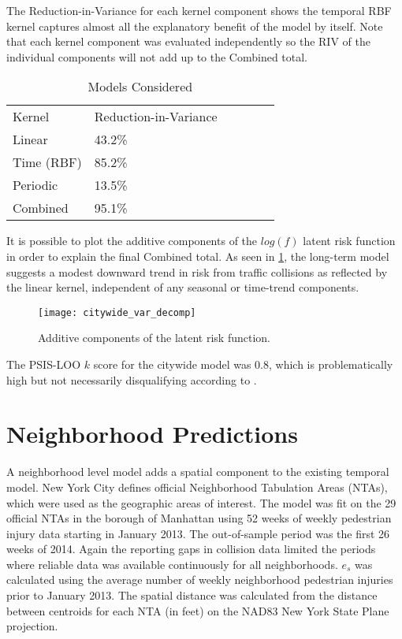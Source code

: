 The Reduction-in-Variance for each kernel component shows the temporal RBF kernel captures almost all the explanatory benefit of the model by itself. Note that each kernel component was evaluated independently so the RIV of the individual components will not add up to the Combined total. \par

\begin{table}[h!]
\centering
\caption{Models Considered}
\label{variance_citywide}
\begin{tabular}{@{}llllll@{}}
\toprule
Kernel     & Reduction-in-Variance &  \\
Linear     & 43.2\%                &  \\
Time (RBF) & 85.2\%                &  \\
Periodic   & 13.5\%                &  \\
Combined   & 95.1\%                &
\end{tabular}
\end{table}

It is possible to plot the additive components of the $log(f)$ latent risk function in order to explain the final Combined total. As seen in \ref{citywide_var_decomp}, the long-term model suggests a modest downward trend in risk from traffic collisions as reflected by the linear kernel, independent of any seasonal or time-trend components. \par

\begin{figure}[h!]
  \centering
  \caption{Additive components of the latent risk function.}
  \label{citywide_var_decomp}
  \texttt{[image: citywide\_var\_decomp]}
\end{figure}

The PSIS-LOO $k$ score for the citywide model was 0.8, which is problematically high but not necessarily disqualifying according to \cite{vehtari_loo}.

 \section{Neighborhood Predictions}

 A neighborhood level model adds a spatial component to the existing temporal model.  New York City defines official Neighborhood Tabulation Areas (NTAs), which were used as the geographic areas of interest. The model was fit on the 29 official NTAs in the borough of Manhattan using 52 weeks of weekly pedestrian injury data starting in January 2013. The out-of-sample period was the first 26 weeks of 2014. Again the reporting gaps in collision data limited the periods where reliable data was available continuously for all neighborhoods. $e_s$ was calculated using the average number of weekly neighborhood pedestrian injuries prior to January 2013.  The spatial distance was calculated from the distance between centroids for each NTA (in feet) on the NAD83 New York State Plane projection. \par

